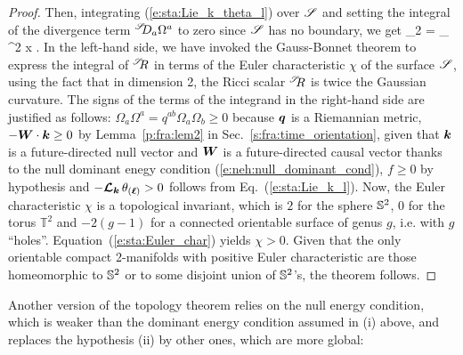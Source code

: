 \begin{proof}
Then, integrating (\ref{e:sta:Lie_k_theta_l}) over $\mathscr{S}$
and setting the integral of the divergence term ${}^{\mathscr{S}}\!\!D_a \Omega^a$ to zero since
$\mathscr{S}$ has no boundary, we get
\be \label{e:sta:Euler_char}
    _{2\pi\chi} = \int_\Sp {}
           \, \D^2 x .
\ee
In the left-hand side, we have invoked the Gauss-Bonnet theorem
to express the integral of ${}^{\mathscr{S}}\!\! R$ in terms
of the Euler characteristic $\chi$ of the
surface $\mathscr{S}$, using the fact that in dimension 2,
the Ricci scalar ${}^{\mathscr{S}}\!\! R$ is twice the
Gaussian curvature.
The signs of the terms of the integrand in the right-hand side
are justified as follows:
$\Omega_a \Omega^a = q^{ab} \Omega_a \Omega_b \geq 0$ because $\bm{q}$ is a Riemannian metric,
$- \bm{W}\cdot\bm{k} \geq 0$ by Lemma~\ref{p:fra:lem2} in Sec.~\ref{s:fra:time_orientation},
given that $\bm{k}$ is a future-directed null vector and $\bm{W}$ is a future-directed
causal vector thanks to the null dominant enegy condition (\ref{e:neh:null_dominant_cond}),
$f\geq 0$ by hypothesis and $- \bm{\mathcal{L}}_{\bm{k}}\, \theta_{(\bm{\ell})} > 0$
follows from Eq.~(\ref{e:sta:Lie_k_l}). Now, the Euler characteristic $\chi$ is a topological
invariant, which is $2$ for the sphere $\mathbb{S}^2$, $0$ for the torus $\mathbb{T}^2$
and $-2(g-1)$
for a connected orientable surface of genus $g$, i.e. with $g$ ``holes''.
Equation~(\ref{e:sta:Euler_char}) yields $\chi > 0$. Given that the only orientable
compact 2-manifolds
with positive Euler characteristic are those homeomorphic to $\mathbb{S}^2$ or
to some disjoint union of $\mathbb{S}^2$'s, the theorem follows.
\end{proof}

Another version of the topology theorem relies on the null energy
condition, which is weaker than the dominant energy condition assumed in (i) above,
and replaces the hypothesis (ii) by other ones, which are more global:

